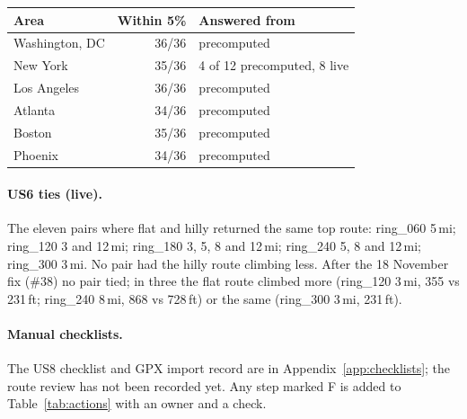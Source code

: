 \begin{center}\small
\begin{tabular}{@{}l r l@{}}
\toprule
Area & Within 5\% & Answered from \\
\midrule
Washington, DC & 36/36 & precomputed \\
New York & 35/36 & 4 of 12 precomputed, 8 live \\
Los Angeles & 36/36 & precomputed \\
Atlanta & 34/36 & precomputed \\
Boston & 35/36 & precomputed \\
Phoenix & 34/36 & precomputed \\
\bottomrule
\end{tabular}
\end{center}

\paragraph{US6 ties (live).} The eleven pairs where flat and hilly returned
the same top route: ring\_060 5\,mi; ring\_120 3 and 12\,mi; ring\_180 3, 5, 8
and 12\,mi; ring\_240 5, 8 and 12\,mi; ring\_300 3\,mi. No pair had the hilly
route climbing less. After the 18 November fix (\#38) no pair tied; in three
the flat route climbed more (ring\_120 3\,mi, 355 vs 231\,ft; ring\_240 8\,mi,
868 vs 728\,ft) or the same (ring\_300 3\,mi, 231\,ft).

\paragraph{Manual checklists.} The US8 checklist and GPX import record are in
Appendix~\ref{app:checklists}; the route review has not been recorded yet. Any step marked F is added to
Table~\ref{tab:actions} with an owner and a check.
